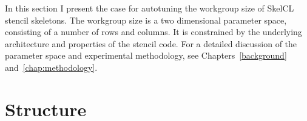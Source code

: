 In this section I present the case for autotuning the workgroup size
of SkelCL stencil skeletons. The workgroup size is a two dimensional
parameter space, consisting of a number of rows and columns. It is
constrained by the underlying architecture and properties of the
stencil code. For a detailed discussion of the parameter space and
experimental methodology, see Chapters~\ref{background}
and~\ref{chap:methodology}.

\TODO{\ldots}






\section{Structure}

